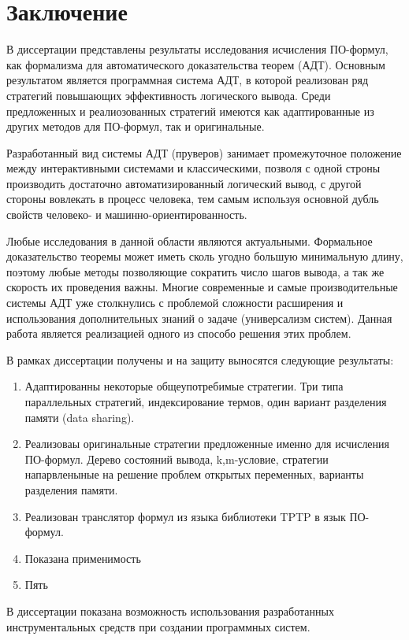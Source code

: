 \chapter*{Заключение}

В диссертации представлены результаты исследования исчисления ПО-формул, как формализма для автоматического доказательства теорем (АДТ). Основным результатом является программная система АДТ, в которой реализован ряд стратегий повышающих эффективность логического вывода. Среди предложенных и реалиозованных стратегий имеются как адаптированные из других методов для ПО-формул, так и оригинальные. 

Разработанный вид системы АДТ (пруверов) занимает промежуточное положение между интерактивными системами и классическими, позволя с одной строны производить достаточно автоматизированный логический вывод, с другой стороны вовлекать в процесс человека, тем самым используя основной дубль свойств человеко- и машинно-ориентированность.

Любые исследования в данной области являются актуальными. Формальное доказательство теоремы может иметь сколь угодно большую минимальную длину, поэтому любые методы позволяющие сократить число шагов вывода, а так же скорость их проведения важны. Многие современные и самые производительные системы АДТ уже столкнулись с проблемой сложности расширения и использования дополнительных знаний о задаче (универсализм систем). Данная работа является реализацией одного из способо решения этих проблем.


В рамках диссертации получены и на защиту выносятся следующие результаты:
\begin{enumerate}
\item Адаптированны некоторые общеупотребимые стратегии. Три типа параллельных стратегий, индексирование термов, один вариант разделения памяти (data sharing).
\item Реализоваы оригинальные стратегии предложенные именно для исчисления ПО-формул. Дерево состояний вывода, k,m-условие, стратегии напарвленыные на решение проблем открытых переменных, варианты разделения памяти.
\item Реализован транслятор формул из языка библиотеки TPTP в язык ПО-формул.
\item Показана применимость
\item Пять
\end{enumerate}

В диссертации показана возможность использования разработанных инструментальных средств при создании программных систем.

